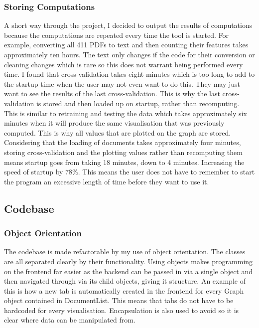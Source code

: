 			\subsubsection{Storing Computations}
				A short way through the project, I decided to output the results of computations because the computations are repeated every time the tool is started. For example, converting all 411 PDFs to text and then counting their features takes approximately ten hours. The text only changes if the code for their conversion or cleaning changes which is rare so this does not warrant being performed every time. I found that cross-validation takes eight minutes which is too long to add to the startup time when the user may not even want to do this. They may just want to see the results of the last cross-validation. This is why the last cross-validation is stored and then loaded up on startup, rather than recomputing. This is similar to retraining and testing the data which takes approximately six minutes when it will produce the same visualisation that was previously computed. This is why all values that are plotted on the graph are stored. Considering that the loading of documents takes approximately four minutes, storing cross-validation and the plotting values rather than recomputing them means startup goes from taking 18 minutes, down to 4 minutes. Increasing the speed of startup by 78\%. This means the user does not have to remember to start the program an excessive length of time before they want to use it.
		\subsection{Codebase}
			\subsubsection{Object Orientation}
				The codebase is made refactorable by my use of object orientation. The classes are all separated clearly by their functionality. Using objects makes programming on the frontend far easier as the backend can be passed in via a single object and then navigated through via its child objects, giving it structure. An example of this is how a new tab is automatically created in the frontend for every Graph object contained in DocumentList. This means that tabs do not have to be hardcoded for every visualisation. Encapsulation is also used to avoid so it is clear where data can be manipulated from.
